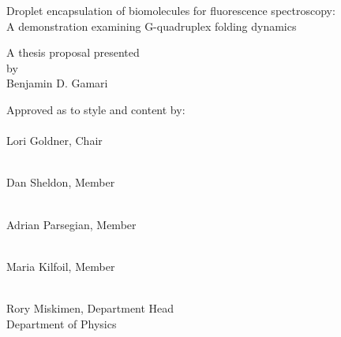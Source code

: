 \begin{center}
\Large{
Droplet encapsulation of biomolecules for fluorescence spectroscopy: \\
A demonstration examining G-quadruplex folding dynamics
}
\end{center}
\vspace{10em}
\begin{center}
A thesis proposal presented \\
by \\
{\sc Benjamin D. Gamari}
\end{center}
\vspace{10em}

Approved as to style and content by:\\

\makebox[2.5in]{\hrulefill} \\
Lori Goldner, Chair

\makebox[2.5in]{\hrulefill} \\
Dan Sheldon, Member

\makebox[2.5in]{\hrulefill} \\
Adrian Parsegian, Member

\makebox[2.5in]{\hrulefill} \\
Maria Kilfoil, Member

\vspace{10em}
\hspace{20em}
\parbox[t]{3in}{
\makebox[2.5in]{\hrulefill} \\
\hspace{20em} Rory Miskimen, Department Head \\
\hspace{20em} Department of Physics
}